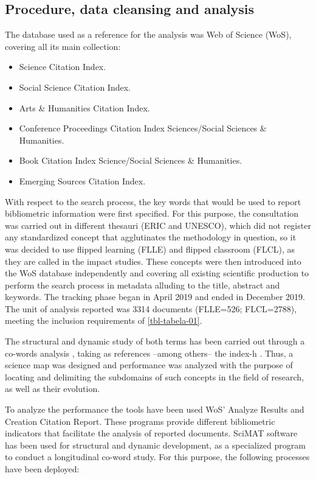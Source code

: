 \documentclass{textolivre}
\begin{document}
\subsection{Procedure, data cleansing and analysis}\label{sec-procedure}
The database used as a reference for the analysis was Web of Science (WoS), covering all its main collection:

\begin{itemize}
    \item Science Citation Index.
    \item Social Science Citation Index.
    \item Arts \& Humanities Citation Index.
    \item Conference Proceedings Citation Index Sciences/Social Sciences \& Humanities.
    \item Book Citation Index Science/Social Sciences \& Humanities.
    \item Emerging Sources Citation Index.
\end{itemize}

With respect to the search process, the key words that would be used to report bibliometric information were first specified. For this purpose, the consultation was carried out in different thesauri (ERIC and UNESCO), which did not register any standardized concept that agglutinates the methodology in question, so it was decided to use flipped learning (FLLE) and flipped classroom (FLCL), as they are called in the impact studies. These concepts were then introduced into the WoS database independently and covering all existing scientific production to perform the search process in metadata alluding to the title, abstract and keywords. The tracking phase began in April 2019 and ended in December 2019. The unit of analysis reported was 3314 documents (FLLE=526; FLCL=2788), meeting the inclusion requirements of \cref{tbl-tabela-01}.

The structural and dynamic study of both terms has been carried out through a co-words analysis \cite{hirsch_index_2005}, taking as references –among others– the index-h \cite{cobo_science_2011}. Thus, a science map was designed and performance was analyzed with the purpose of locating and delimiting the subdomains of such concepts in the field of research, as well as their evolution.

To analyze the performance the tools have been used WoS' Analyze Results and Creation Citation Report. These programs provide different bibliometric indicators that facilitate the analysis of reported documents. SciMAT software has been used for structural and dynamic development, as a specialized program to conduct a longitudinal co-word study. For this purpose, the following processes have been deployed:
\end{document}
